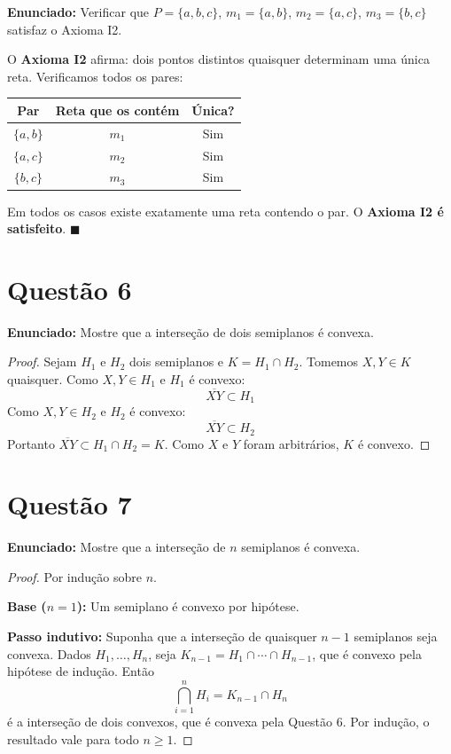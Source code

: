 \documentclass[12pt,a4paper]{article}
\begin{document}
\textbf{Enunciado:} Verificar que $P = \{a,b,c\}$, $m_1 = \{a,b\}$, $m_2 = \{a,c\}$, $m_3 = \{b,c\}$ satisfaz o Axioma I2.

O \textbf{Axioma I2} afirma: dois pontos distintos quaisquer determinam uma \'unica reta. Verificamos todos os pares:

\begin{center}
\begin{tabular}{ccc}
\toprule
Par & Reta que os cont\'em & \'Unica? \\
\midrule
$\{a,b\}$ & $m_1$ & Sim \\
$\{a,c\}$ & $m_2$ & Sim \\
$\{b,c\}$ & $m_3$ & Sim \\
\bottomrule
\end{tabular}
\end{center}

Em todos os casos existe exatamente uma reta contendo o par. O \textbf{Axioma I2 \'e satisfeito}. $\blacksquare$

\section*{Quest\~ao 6}

\textbf{Enunciado:} Mostre que a interse\c{c}\~ao de dois semiplanos \'e convexa.

\begin{proof}
Sejam $H_1$ e $H_2$ dois semiplanos e $K = H_1 \cap H_2$. Tomemos $X, Y \in K$ quaisquer. Como $X, Y \in H_1$ e $H_1$ \'e convexo:
$$\overline{XY} \subset H_1$$
Como $X, Y \in H_2$ e $H_2$ \'e convexo:
$$\overline{XY} \subset H_2$$
Portanto $\overline{XY} \subset H_1 \cap H_2 = K$. Como $X$ e $Y$ foram arbitr\'arios, $K$ \'e convexo.
\end{proof}

\section*{Quest\~ao 7}

\textbf{Enunciado:} Mostre que a interse\c{c}\~ao de $n$ semiplanos \'e convexa.

\begin{proof}
Por indu\c{c}\~ao sobre $n$.

\textbf{Base ($n=1$):} Um semiplano \'e convexo por hip\'otese.

\textbf{Passo indutivo:} Suponha que a interse\c{c}\~ao de quaisquer $n-1$ semiplanos seja convexa. Dados $H_1, \ldots, H_n$, seja $K_{n-1} = H_1 \cap \cdots \cap H_{n-1}$, que \'e convexo pela hip\'otese de indu\c{c}\~ao. Ent\~ao
$$\bigcap_{i=1}^n H_i = K_{n-1} \cap H_n$$
\'e a interse\c{c}\~ao de dois convexos, que \'e convexa pela Quest\~ao 6. Por indu\c{c}\~ao, o resultado vale para todo $n \geq 1$.
\end{proof}
\end{document}
